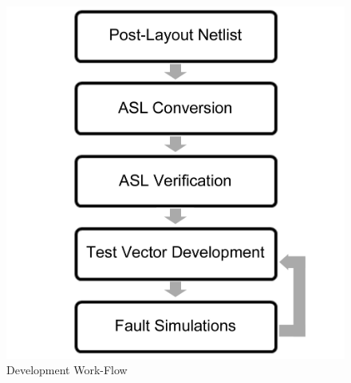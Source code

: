 \documentclass[12pt]{report}
\begin{document}
\begin{figure}
  \begin{center}
		\includegraphics[scale=.1]{images/development-flowchart}
  \end{center}
	\caption{Development Work-Flow}
	\label{fig:designworkflow}
\end{figure}
\end{document}
